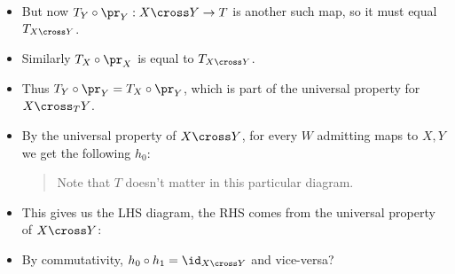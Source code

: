 \begin{center}
\end{center}

\begin{itemize}
\tightlist
\item
  But now \(T_Y \circ \pr_Y: X\cross Y \to T\) is another such map, so
  it must equal \(T_{X\cross Y}\).
\item
  Similarly \(T_X \circ \pr_X\) is equal to \(T_{X\cross Y}\).
\item
  Thus \(T_Y \circ \pr_Y = T_X \circ \pr_Y\), which is part of the
  universal property for \(X\cross_T Y\).
\item
  By the universal property of \(X\cross Y\), for every \(W\) admitting
  maps to \(X, Y\) we get the following \(h_0\):

  \begin{center}
  \end{center}

  \begin{quote}
  Note that \(T\) doesn't matter in this particular diagram.
  \end{quote}
\item
  This gives us the LHS diagram, the RHS comes from the universal
  property of \(X\cross Y\):

  \begin{center}
  \end{center}
\item
  By commutativity, \(h_0 \circ h_1 = \id_{X\cross Y}\) and vice-versa?
\end{itemize}

